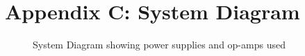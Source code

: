 \chapter{Appendix C: System Diagram}

\begin{figure}[H]
    \centering
    \caption{System Diagram showing power supplies and op-amps used}
    \label{fig:system_diagram}
\end{figure}